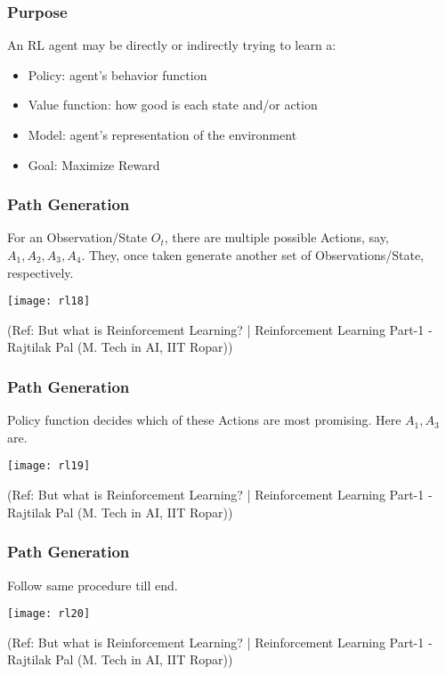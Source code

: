 \begin{frame}[fragile]\frametitle{Purpose}

An RL agent may be directly or indirectly trying to learn a:

\begin{itemize}
\item Policy: agent’s behavior function
\item Value function: how good is each state and/or action
\item Model: agent’s representation of the environment
\item Goal: Maximize Reward
\end{itemize}
\end{frame}


\begin{frame}[fragile]\frametitle{Path Generation}

For an Observation/State $O_t$, there are multiple possible Actions, say, $A_1, A_2, A_3, A_4$. They, once taken generate another set of Observations/State, respectively.

\begin{center}
\texttt{[image: rl18]}
\end{center}


{\tiny (Ref: But what is Reinforcement Learning? | Reinforcement Learning Part-1 - Rajtilak Pal (M. Tech in AI, IIT Ropar))}

\end{frame}

\begin{frame}[fragile]\frametitle{Path Generation}

Policy function decides which of these Actions are most promising. Here $A_1, A_3$ are.

\begin{center}
\texttt{[image: rl19]}
\end{center}


{\tiny (Ref: But what is Reinforcement Learning? | Reinforcement Learning Part-1 - Rajtilak Pal (M. Tech in AI, IIT Ropar))}

\end{frame}

\begin{frame}[fragile]\frametitle{Path Generation}

Follow same procedure till end. 

\begin{center}
\texttt{[image: rl20]}
\end{center}


{\tiny (Ref: But what is Reinforcement Learning? | Reinforcement Learning Part-1 - Rajtilak Pal (M. Tech in AI, IIT Ropar))}

\end{frame}


